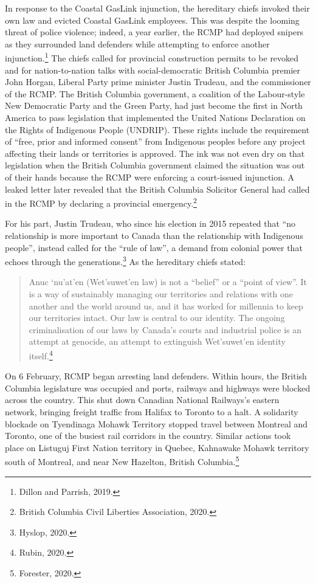 In response to the Coastal GasLink injunction, the hereditary chiefs invoked their own law and evicted Coastal GasLink employees. This was despite the looming threat of police violence; indeed, a year earlier, the RCMP had deployed snipers as they surrounded land defenders while attempting to enforce another injunction.\footnote{Dillon and Parrish, 2019.} The chiefs called for provincial construction permits to be revoked and for nation-to-nation talks with social-democratic British Columbia premier John Horgan, Liberal Party prime minister Justin Trudeau, and the commissioner of the RCMP. The British Columbia government, a coalition of the Labour-style New Democratic Party and the Green Party, had just become the first in North America to pass legislation that implemented the United Nations Declaration on the Rights of Indigenous People (UNDRIP). These rights include the requirement of ``free, prior and informed consent'' from Indigenous peoples before any project affecting their lands or territories is approved. The ink was not even dry on that legislation when the British Columbia government claimed the situation was out of their hands because the RCMP were enforcing a court-issued injunction. A leaked letter later revealed that the British Columbia Solicitor General had called in the RCMP by declaring a provincial emergency.\footnote{British Columbia Civil Liberties Association, 2020.}

For his part, Justin Trudeau, who since his election in 2015 repeated that ``no relationship is more important to Canada than the relationship with Indigenous people'', instead called for the ``rule of law'', a demand from colonial power that echoes through the generations.\footnote{Hyslop, 2020.} As the hereditary chiefs stated:

\blockquote{Anuc `nu'at'en (Wet'suwet'en law) is not a ``belief'' or a ``point of view''. It is a way of sustainably managing our territories and relations with one another and the world around us, and it has worked for millennia to keep our territories intact. Our law is central to our identity. The ongoing criminalisation of our laws by Canada's courts and industrial police is an attempt at genocide, an attempt to extinguish Wet'suwet'en identity itself.\footnote{Rubin, 2020.}}

On 6 February, RCMP began arresting land defenders. Within hours, the British Columbia legislature was occupied and ports, railways and highways were blocked across the country. This shut down Canadian National Railways's eastern network, bringing freight traffic from Halifax to Toronto to a halt. A solidarity blockade on Tyendinaga Mohawk Territory stopped travel between Montreal and Toronto, one of the busiest rail corridors in the country. Similar actions took place on Listuguj First Nation territory in Quebec, Kahnawake Mohawk territory south of Montreal, and near New Hazelton, British Columbia.\footnote{Forester, 2020.}


